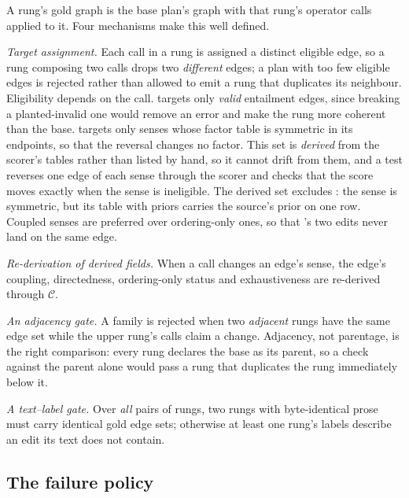 A rung's gold graph is the base plan's graph with that rung's operator calls applied to it. Four mechanisms make
this well defined.

\emph{Target assignment.} Each call in a rung is assigned a distinct eligible edge, so a rung composing two
 calls drops two \emph{different} edges; a plan with too few eligible edges is rejected rather
than allowed to emit a rung that duplicates its neighbour. Eligibility depends on the call. 
targets only \emph{valid} entailment edges, since breaking a planted-invalid one would remove an error and make the
rung more coherent than the base.  targets only senses whose factor table is symmetric in
its endpoints, so that the reversal changes no factor. This set is \emph{derived} from the scorer's tables rather
than listed by hand, so it cannot drift from them, and a test reverses one edge of each sense through the scorer and
checks that the score moves exactly when the sense is ineligible. The derived set excludes : the
sense is symmetric, but its \con{} table with priors carries the source's prior on one row. Coupled senses are
preferred over ordering-only ones, so that 's two edits never land on the same edge.

\emph{Re-derivation of derived fields.} When a call changes an edge's sense, the edge's coupling, directedness,
ordering-only status and exhaustiveness are re-derived through $\mathcal{C}$.

\emph{An adjacency gate.} A family is rejected when two \emph{adjacent} rungs have the same edge set while the
upper rung's calls claim a change. Adjacency, not parentage, is the right comparison: every  rung
declares the base as its parent, so a check against the parent alone would pass a rung that duplicates the rung
immediately below it.

\emph{A text--label gate.} Over \emph{all} pairs of rungs, two rungs with byte-identical prose must carry identical
gold edge sets; otherwise at least one rung's labels describe an edit its text does not contain.

\subsection{The failure policy}
\label{sec-failure}

